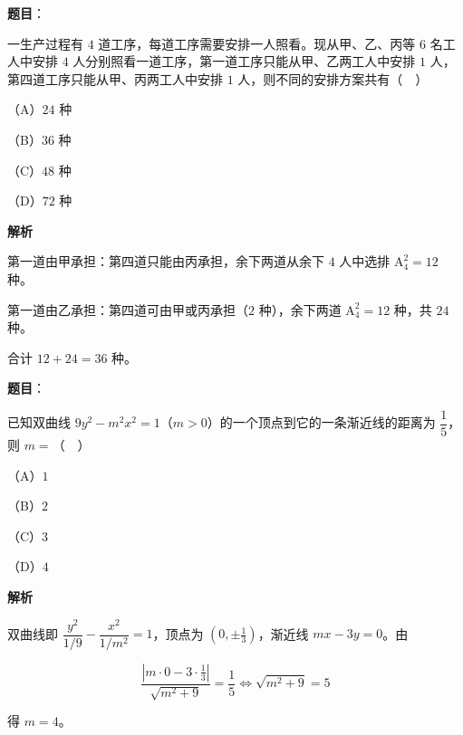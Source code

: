 \begin{answer}

\textbf{题目}：

一生产过程有 $4$ 道工序，每道工序需要安排一人照看。现从甲、乙、丙等 $6$ 名工人中安排 $4$ 人分别照看一道工序，第一道工序只能从甲、乙两工人中安排 $1$ 人，第四道工序只能从甲、丙两工人中安排 $1$ 人，则不同的安排方案共有（　）

（A）$24$ 种

（B）$36$ 种

（C）$48$ 种

（D）$72$ 种

\textbf{解析}

第一道由甲承担：第四道只能由丙承担，余下两道从余下 $4$ 人中选排 $\mathrm A_4^2=12$ 种。

第一道由乙承担：第四道可由甲或丙承担（$2$ 种），余下两道 $\mathrm A_4^2=12$ 种，共 $24$ 种。

合计 $12+24=36$ 种。


\end{answer}
\begin{answer}

\textbf{题目}：

已知双曲线 $9y^2-m^2x^2=1$（$m>0$）的一个顶点到它的一条渐近线的距离为 $\dfrac15$，则 $m=$（　）

（A）$1$

（B）$2$

（C）$3$

（D）$4$

\textbf{解析}

双曲线即 $\dfrac{y^2}{1/9}-\dfrac{x^2}{1/m^2}=1$，顶点为 $\left(0,\pm\tfrac13\right)$，渐近线 $mx-3y=0$。由

\nopagebreak[4]
\[\frac{\left|m\cdot0-3\cdot\frac13\right|}{\sqrt{m^2+9}}=\frac15\iff\sqrt{m^2+9}=5\]

得 $m=4$。


\end{answer}
